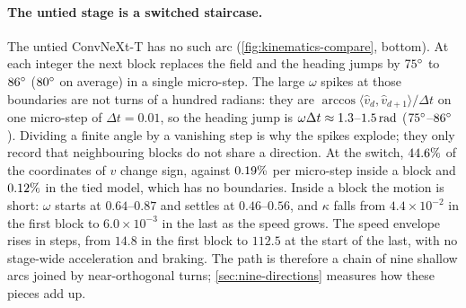 \paragraph{The untied stage is a switched staircase.}
The untied ConvNeXt-T has no such arc (\cref{fig:kinematics-compare}, bottom).
At each integer the next block replaces the field and the heading jumps by
$75^\circ$ to $86^\circ$ ($80^\circ$ on average) in a single
micro-step.
The large $\omega$ spikes at those boundaries are not turns of a hundred radians:
they are $\arccos\langle\hat v_d,\hat v_{d+1}\rangle/\Delta t$ on one micro-step of
$\Delta t{=}0.01$, so the heading jump is $\omega\Delta t\approx
1.3$--$1.5\,\mathrm{rad}$
($75^\circ$--$86^\circ$).
Dividing a finite angle by a vanishing step is why the spikes explode; they only record
that neighbouring blocks do not share a direction.
At the switch, $44.6\%$ of the coordinates of $v$ change sign, against
$0.19\%$ per micro-step inside a block and $0.12\%$ in
the tied model, which has no boundaries.
Inside a block the motion is short: $\omega$ starts at $0.64$--$0.87$ and settles at
$0.46$--$0.56$, and $\kappa$ falls from $4.4{\times}10^{-2}$ in the first block to
$6.0{\times}10^{-3}$ in the last as the speed grows.
The speed envelope rises in steps, from $14.8$ in the first block to $112.5$ at the
start of the last, with no stage-wide acceleration and braking.
The path is therefore a chain of nine shallow arcs joined by near-orthogonal turns;
\cref{sec:nine-directions} measures how these pieces add up.
